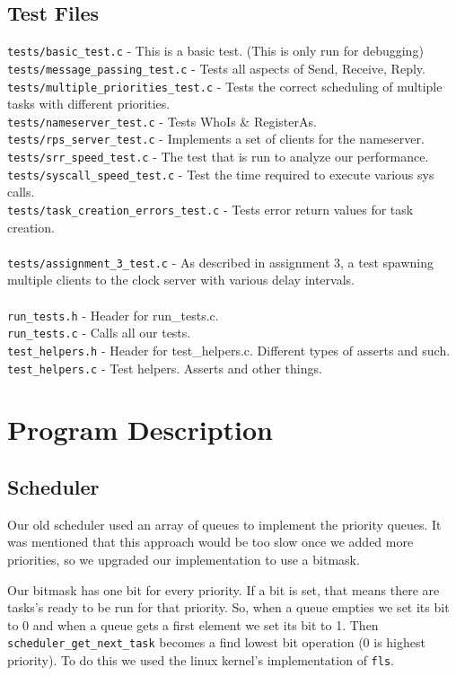 \documentclass[letterpaper]{article}
\begin{document}
\subsection{Test Files}
\verb!tests/basic_test.c! - This is a basic test. (This is only run for debugging)\\
\verb!tests/message_passing_test.c! - Tests all aspects of Send, Receive, Reply.\\
\verb!tests/multiple_priorities_test.c! - Tests the correct scheduling of multiple tasks with different priorities.\\
\verb!tests/nameserver_test.c! - Tests WhoIs \& RegisterAs.\\
\verb!tests/rps_server_test.c! - Implements a set of clients for the nameserver.\\
\verb!tests/srr_speed_test.c! - The test that is run to analyze our performance.\\
\verb!tests/syscall_speed_test.c! - Test the time required to execute various sys calls.\\
\verb!tests/task_creation_errors_test.c! - Tests error return values for task creation.\\
\\
\verb!tests/assignment_3_test.c! - As described in assignment 3, a test spawning multiple clients to the clock server with various delay intervals.\\
\\
\verb!run_tests.h! - Header for run\_tests.c.\\
\verb!run_tests.c! - Calls all our tests.\\
\verb!test_helpers.h! - Header for test\_helpers.c. Different types of asserts and such.\\
\verb!test_helpers.c! - Test helpers. Asserts and other things.

\section{Program Description}

\subsection{Scheduler}

Our old scheduler used an array of queues to implement the priority queues. It was mentioned that this approach would be too slow once we added more priorities, so we upgraded our implementation to use a bitmask.

Our bitmask has one bit for every priority. If a bit is set, that means there are tasks's ready to be run for that priority. So, when a queue empties we set its bit to 0 and when a queue gets a first element we set its bit to 1. Then {\tt scheduler\_get\_next\_task} becomes a find lowest bit operation (0 is highest priority). To do this we used the linux kernel's implementation of {\tt fls}.
\end{document}
